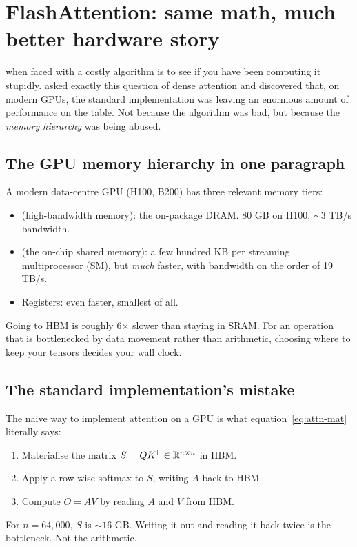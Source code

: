 \section{FlashAttention: same math, much better hardware story}
\label{ch:flashattention}

 when faced with a costly algorithm is
to see if you have been computing it stupidly. \citet{dao2022flashattention}
asked exactly this question of dense attention and discovered that, on
modern GPUs, the standard implementation was leaving an enormous amount of
performance on the table. Not because the algorithm was bad, but because
the \emph{memory hierarchy} was being abused.

\subsection{The GPU memory hierarchy in one paragraph}

A modern data-centre GPU (H100, B200) has three relevant memory tiers:

\begin{itemize}
\item {} (high-bandwidth memory): the on-package DRAM. 80 GB on
H100, ${\sim}3$ TB/s bandwidth.
\item {} (the on-chip shared memory): a few hundred KB per
streaming multiprocessor (SM), but \emph{much} faster, with bandwidth on the
order of 19 TB/s.
\item Registers: even faster, smallest of all.
\end{itemize}

Going to HBM is roughly 6$\times$ slower than staying in SRAM. For an
operation that is bottlenecked by data movement rather than arithmetic,
choosing where to keep your tensors decides your wall clock.

\subsection{The standard implementation's mistake}

The naive way to implement attention on a GPU is what
equation~\eqref{eq:attn-mat} literally says:
\begin{enumerate}
\item Materialise the matrix \(S = QK^{\!\top} \in \mathbb{R}^{n \times n}\) in HBM.
\item Apply a row-wise softmax to \(S\), writing \(A\) back to HBM.
\item Compute \(O = A V\) by reading \(A\) and \(V\) from HBM.
\end{enumerate}
For \(n = 64{,}000\), \(S\) is \({\sim}16\) GB. Writing it out and reading
it back twice is the bottleneck. Not the arithmetic.


